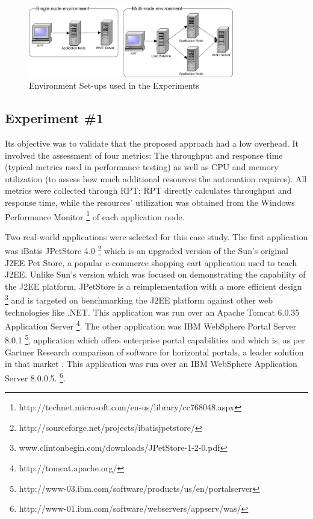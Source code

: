 \documentclass[runningheads,a4paper]{llncs}
\begin{document}
\begin{figure}[!h]
\centering
\includegraphics[totalheight=.25\textheight,width=0.8\textwidth]{Environments}
\caption{Environment Set-ups used in the Experiments}
\label{fig_env}
\end{figure}

\subsection{Experiment \#1}

Its objective was to validate that the proposed approach had a low overhead.
It involved the assessment of four metrics: The throughput and response time
(typical metrics used in performance testing) as well as CPU and memory utilization (to assess how much additional resources the automation
requires). All metrics were collected through RPT: RPT directly
calculates throughput and response time, while the resources' utilization was
obtained from the Windows Performance Monitor \footnote{http://technet.microsoft.com/en-us/library/cc768048.aspx} of each application node.

Two real-world applications were selected for this case study. The first
application was iBatis JPetStore 4.0
\footnote{http://sourceforge.net/projects/ibatisjpetstore/} which is an 
upgraded version of the Sun's original J2EE Pet Store, a popular e-commerce
shopping cart application used to teach J2EE. Unlike Sun’s version which was 
focused on demonstrating the capability of the J2EE platform, JPetStore is a
reimplementation with a more efficient design \footnote{www.clintonbegin.com/downloads/JPetStore-1-2-0.pdf‎} and is 
targeted on benchmarking the J2EE platform against other web technologies
like .NET. This application was run over an Apache
Tomcat 6.0.35 Application Server \footnote{http://tomcat.apache.org/}. The
other application was IBM WebSphere Portal Server 8.0.1
\footnote{http://www-03.ibm.com/software/products/us/en/portalserver},
application which offers enterprise portal capabilities and which is, as per
Gartner Research comparison of software for horizontal portals, a leader solution in that market \cite{Gartner2008}. 
This application was run over an IBM WebSphere Application Server 8.0.0.5.
\footnote{http://www-01.ibm.com/software/webservers/appserv/was/}.
\end{document}
